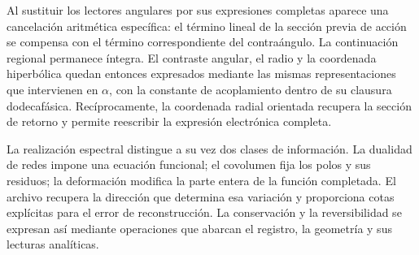 Al sustituir los lectores angulares por sus expresiones completas aparece una cancelación aritmética específica: el término lineal de la sección previa de acción se compensa con el término correspondiente del contraángulo. La continuación regional permanece íntegra. El contraste angular, el radio y la coordenada hiperbólica quedan entonces expresados mediante las mismas representaciones que intervienen en \(\alpha\), con la constante de acoplamiento dentro de su clausura dodecafásica. Recíprocamente, la coordenada radial orientada recupera la sección de retorno y permite reescribir la expresión electrónica completa.

La realización espectral distingue a su vez dos clases de información. La dualidad de redes impone una ecuación funcional; el covolumen fija los polos y sus residuos; la deformación modifica la parte entera de la función completada. El archivo recupera la dirección que determina esa variación y proporciona cotas explícitas para el error de reconstrucción. La conservación y la reversibilidad se expresan así mediante operaciones que abarcan el registro, la geometría y sus lecturas analíticas.

\HMTMathematicalPaper
